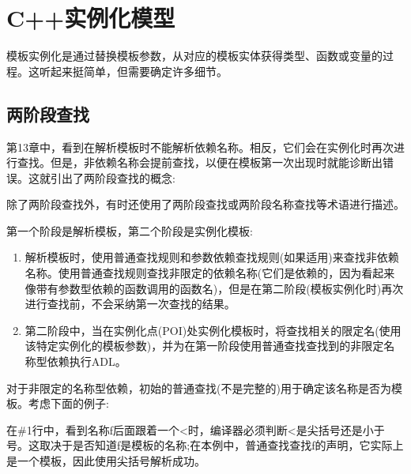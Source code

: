\section{C++实例化模型}

模板实例化是通过替换模板参数，从对应的模板实体获得类型、函数或变量的过程。这听起来挺简单，但需要确定许多细节。

\subsection{两阶段查找}

第13章中，看到在解析模板时不能解析依赖名称。相反，它们会在实例化时再次进行查找。但是，非依赖名称会提前查找，以便在模板第一次出现时就能诊断出错误。这就引出了两阶段查找的概念:

\begin{notice}
除了两阶段查找外，有时还使用了两阶段查找或两阶段名称查找等术语进行描述。
\end{notice}

第一个阶段是解析模板，第二个阶段是实例化模板:

\begin{enumerate}
\item 
解析模板时，使用普通查找规则和参数依赖查找规则(如果适用)来查找非依赖名称。使用普通查找规则查找非限定的依赖名称(它们是依赖的，因为看起来像带有参数型依赖的函数调用的函数名)，但是在第二阶段(模板实例化时)再次进行查找前，不会采纳第一次查找的结果。

\item 
第二阶段中，当在实例化点(POI)处实例化模板时，将查找相关的限定名(使用该特定实例化的模板参数)，并为在第一阶段使用普通查找查找到的非限定名称型依赖执行ADL。
\end{enumerate}

对于非限定的名称型依赖，初始的普通查找(不是完整的)用于确定该名称是否为模板。考虑下面的例子:


在\#1行中，看到名称f后面跟着一个<时，编译器必须判断<是尖括号还是小于号。这取决于是否知道f是模板的名称;在本例中，普通查找查找f的声明，它实际上是一个模板，因此使用尖括号解析成功。

